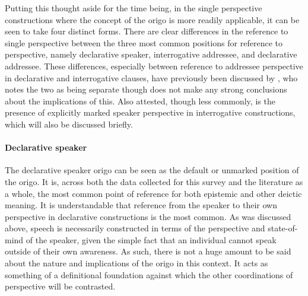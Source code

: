 Putting this thought aside for the time being, in the single perspective constructions where the concept of the origo is more readily applicable, it can be seen to take four distinct forms. There are clear differences in the reference to single perspective between the three most common positions for reference to perspective, namely declarative speaker, interrogative addressee, and declarative addressee. These differences, especially between reference to addressee perspective in declarative and interrogative clauses, have previously been discussed by , who notes the two as being separate though does not make any strong conclusions about the implications of this. Also attested, though less commonly, is the presence of explicitly marked speaker perspective in interrogative constructions, which will also be discussed briefly.

\paragraph{Declarative speaker}
The declarative speaker origo can be seen as the default or unmarked position of the origo. It is, across both the data collected for this survey and the literature as a whole, the most common point of reference for both epistemic and other deictic meaning. It is understandable that reference from the speaker to their own perspective in declarative constructions is the most common. As was discussed above, speech is necessarily constructed in terms of the perspective and state-of-mind of the speaker, given the simple fact that an individual cannot speak outside of their own awareness. As such, there is not a huge amount to be said about the nature and implications of the origo in this context. It acts as something of a definitional foundation against which the other coordinations of perspective will be contrasted.

